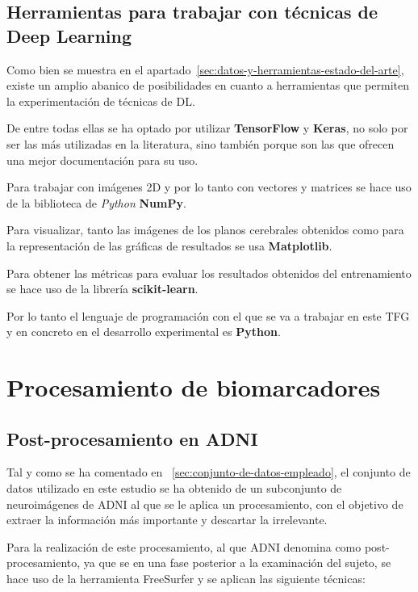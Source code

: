 \subsection{Herramientas para trabajar con técnicas de Deep Learning}
\label{subsec:herramientas-para-trabajar-con-tecnicas-de-deep-learning}
Como bien se muestra en el apartado~\ref{sec:datos-y-herramientas-estado-del-arte}, existe un amplio abanico de
posibilidades en cuanto a herramientas que permiten la experimentación de técnicas de DL.

De entre todas ellas se ha optado por utilizar \textbf{TensorFlow} y \textbf{Keras}, no solo por ser las más utilizadas
en la literatura, sino también porque son las que ofrecen una mejor documentación para su uso.

Para trabajar con imágenes 2D y por lo tanto con vectores y matrices se hace uso de la biblioteca de \textit{Python}
\textbf{NumPy}.

Para visualizar, tanto las imágenes de los planos cerebrales obtenidos como para la representación de las gráficas de
resultados se usa \textbf{Matplotlib}.

Para obtener las métricas para evaluar los resultados obtenidos del entrenamiento se hace uso de la librería
\textbf{scikit-learn}.

Por lo tanto el lenguaje de programación con el que se va a trabajar en este TFG y en concreto en el desarrollo
experimental es \textbf{Python}.

\section{Procesamiento de biomarcadores}\label{sec:procesamiento-de-biomarcadores}

\subsection{Post-procesamiento en ADNI}\label{subsec:post-procesamiento-en-adni}
Tal y como se ha comentado en ~\ref{sec:conjunto-de-datos-empleado}, el conjunto de datos utilizado en este estudio se
ha obtenido de un subconjunto de neuroimágenes de ADNI al que se le aplica un procesamiento, con el objetivo de extraer
la información más importante y descartar la irrelevante.

Para la realización de este procesamiento, al que ADNI denomina como post-procesamiento, ya que se  en una fase
posterior a la examinación del sujeto, se hace uso de la herramienta FreeSurfer y  se aplican las siguiente técnicas:

